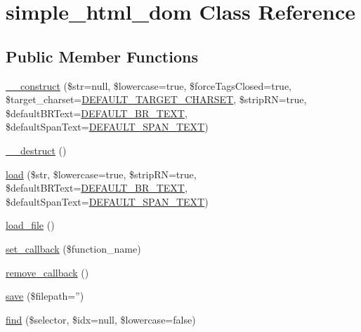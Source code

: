 \hypertarget{classsimple__html__dom}{\section{simple\+\_\+html\+\_\+dom Class Reference}
\label{classsimple__html__dom}
}
\subsection*{Public Member Functions}
\begin{DoxyCompactItemize}
\item 
\hyperlink{classsimple__html__dom_a867090eb38a7d76f8df0b46d22a5226a}{\+\_\+\+\_\+construct} (\$str=null, \$lowercase=true, \$force\+Tags\+Closed=true, \$target\+\_\+charset=\hyperlink{simple__html__dom_8php_aeb01f6d83a65d695ad327473f838319a}{D\+E\+F\+A\+U\+L\+T\+\_\+\+T\+A\+R\+G\+E\+T\+\_\+\+C\+H\+A\+R\+S\+E\+T}, \$strip\+R\+N=true, \$default\+B\+R\+Text=\hyperlink{simple__html__dom_8php_a898bdf60fe4d05c1c50013eed5e2c6e8}{D\+E\+F\+A\+U\+L\+T\+\_\+\+B\+R\+\_\+\+T\+E\+X\+T}, \$default\+Span\+Text=\hyperlink{simple__html__dom_8php_a30d58d7d3a53efc61f064b53a434bafe}{D\+E\+F\+A\+U\+L\+T\+\_\+\+S\+P\+A\+N\+\_\+\+T\+E\+X\+T})
\item 
\hyperlink{classsimple__html__dom_a421831a265621325e1fdd19aace0c758}{\+\_\+\+\_\+destruct} ()
\item 
\hyperlink{classsimple__html__dom_a240a32865f9d9ea1fa681917547a65a5}{load} (\$str, \$lowercase=true, \$strip\+R\+N=true, \$default\+B\+R\+Text=\hyperlink{simple__html__dom_8php_a898bdf60fe4d05c1c50013eed5e2c6e8}{D\+E\+F\+A\+U\+L\+T\+\_\+\+B\+R\+\_\+\+T\+E\+X\+T}, \$default\+Span\+Text=\hyperlink{simple__html__dom_8php_a30d58d7d3a53efc61f064b53a434bafe}{D\+E\+F\+A\+U\+L\+T\+\_\+\+S\+P\+A\+N\+\_\+\+T\+E\+X\+T})
\item 
\hyperlink{classsimple__html__dom_acbf45344758b1a521534cc9cc8ebc5f5}{load\+\_\+file} ()
\item 
\hyperlink{classsimple__html__dom_a40e8b7bf2a1b1acc56b82f9221fb9266}{set\+\_\+callback} (\$function\+\_\+name)
\item 
\hyperlink{classsimple__html__dom_a0af324763ae6d1a475455af727fc5037}{remove\+\_\+callback} ()
\item 
\hyperlink{classsimple__html__dom_a6e80614bedc0513a210906c36f608fa8}{save} (\$filepath='')
\item 
\hyperlink{classsimple__html__dom_afbf375e355aa32c25f7e389a04ddced0}{find} (\$selector, \$idx=null, \$lowercase=false)

\end{DoxyCompactItemize}
